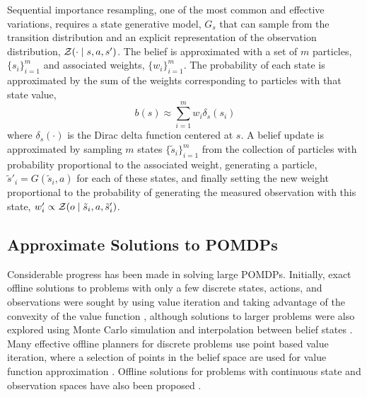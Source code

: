 Sequential importance resampling, one of the most common and effective variations, requires a state generative model, $G_s$ that can sample from the transition distribution and an explicit representation of the observation distribution, $\mathcal{Z}(\cdot \mid s, a, s')$.
The belief is approximated with a set of $m$ particles, $\{s_i\}_{i=1}^m$ and associated weights, $\{w_i\}_{i=1}^m$.
The probability of each state is approximated by the sum of the weights corresponding to particles with that state value,
\begin{equation}
    b(s) \approx \sum_{i=1}^m w_i \delta_s (s_i)
\end{equation}
where $\delta_s(\cdot)$ is the Dirac delta function centered at $s$.
A belief update is approximated by sampling $m$ states $\{\tilde{s}_i\}_{i=1}^m$ from the collection of particles with probability proportional to the associated weight, generating a particle, $\tilde{s}'_i = G(\tilde{s}_i, a)$ for each of these states, and finally setting the new weight proportional to the probability of generating the measured observation with this state, $w'_i \propto \mathcal{Z}(o \mid \tilde{s}_i, a, \tilde{s}'_i)$.

\subsection{Approximate Solutions to POMDPs} \label{sec:solutions}

Considerable progress has been made in solving large POMDPs.
Initially, exact offline solutions to problems with only a few discrete states, actions, and observations were sought by using value iteration and taking advantage of the convexity of the value function \cite{kaelbling1998planning}, although solutions to larger problems were also explored using Monte Carlo simulation and interpolation between belief states \cite{thrun1999monte}.
Many effective offline planners for discrete problems use point based value iteration, where a selection of points in the belief space are used for value function approximation \cite{kurniawati2008sarsop}.
Offline solutions for problems with continuous state and observation spaces have also been proposed \cite{bai2014integrated,brechtel2013solving}.

